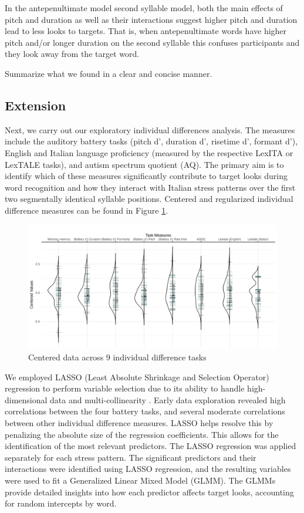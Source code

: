 In the antepenultimate model second syllable model, both the main effects of pitch and duration as well as their interactions suggest higher pitch and duration lead to less looks to targets. That is, when antepenultimate words have higher pitch and/or longer duration on the second syllable this confuses participants and they look away from the target word.

Summarize what we found in a clear and concise manner.


\subsection{Extension}

Next, we carry out our exploratory individual differences analysis. The measures include the auditory battery tasks (pitch d', duration d', risetime d', formant d'), English and Italian language proficiency (measured by the respective LexITA or LexTALE tasks), and autism spectrum quotient (AQ). The primary aim is to identify which of these measures significantly contribute to target looks during word recognition and how they interact with Italian stress patterns over the first two segmentally identical syllable positions. Centered and regularized individual difference measures can be found in Figure \ref{fig:plot_raw_task}.

\begin{figure}[H]
  \centering
  \includegraphics[width=1\linewidth]{visuals/plot_raw_task.jpeg} %
  \caption{Centered data across 9 individual difference tasks}
  \label{fig:plot_raw_task}
\end{figure}


We employed LASSO (Least Absolute Shrinkage and Selection Operator) regression to perform variable selection due to its ability to handle high-dimensional data and multi-collinearity \citep{Zhang2020, Tibshirani1996}. Early data exploration revealed high correlations between the four battery tasks, and several moderate correlations between other individual difference measures. LASSO helps resolve this by penalizing the absolute size of the regression coefficients. This allows for the identification of the most relevant predictors. The LASSO regression was applied separately for each stress pattern. The significant predictors and their interactions were identified using LASSO regression, and the resulting variables were used to fit a Generalized Linear Mixed Model (GLMM). The GLMMs provide detailed insights into how each predictor affects target looks, accounting for random intercepts by word.


